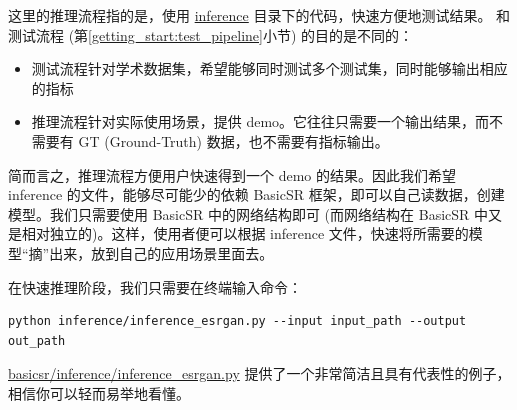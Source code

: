 \documentclass[../main.tex]{subfiles}
\begin{document}
这里的推理流程指的是，使用 \href{https://github.com/XPixelGroup/BasicSR/tree/master/inference}{inference} 目录下的代码，快速方便地测试结果。
和测试流程 (第\ref{getting_start:test_pipeline}小节) 的目的是不同的：
\begin{itemize}
    \item 测试流程针对学术数据集，希望能够同时测试多个测试集，同时能够输出相应的指标
    \item 推理流程针对实际使用场景，提供 demo。它往往只需要一个输出结果，而不需要有 GT (Ground-Truth) 数据，也不需要有指标输出。
\end{itemize}

简而言之，推理流程方便用户快速得到一个 demo 的结果。因此我们希望 inference 的文件，能够尽可能少的依赖 BasicSR 框架，即可以自己读数据，创建模型。我们只需要使用 BasicSR 中的网络结构即可 (而网络结构在 BasicSR 中又是相对独立的)。这样，使用者便可以根据 inference 文件，快速将所需要的模型“摘”出来，放到自己的应用场景里面去。

在快速推理阶段，我们只需要在终端输入命令：
\begin{verbatim}
python inference/inference_esrgan.py --input input_path --output out_path
\end{verbatim}

\href{https://github.com/XPixelGroup/BasicSR/tree/master/inference/inference\_esrgan.py}{basicsr/inference/inference\_esrgan.py} 提供了一个非常简洁且具有代表性的例子，相信你可以轻而易举地看懂。


\end{document}
